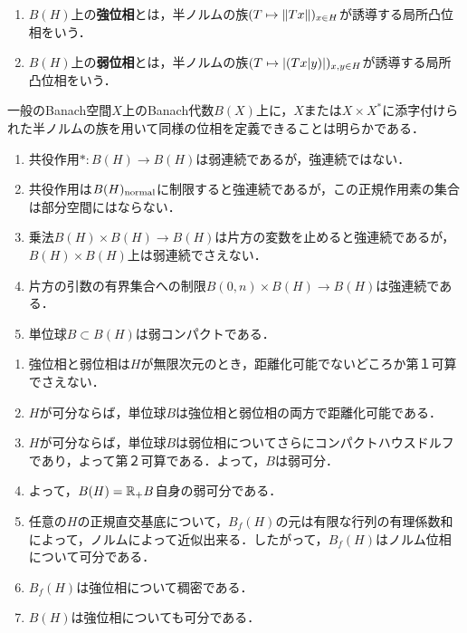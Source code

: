 \documentclass[uplatex,dvipdfmx]{jsreport}
\begin{document}
\begin{definition}\mbox{}
    \begin{enumerate}
        \item $B(H)$上の\textbf{強位相}とは，半ノルムの族$(T\mapsto\|Tx\|)_{x\in H}$が誘導する局所凸位相をいう．
        \item $B(H)$上の\textbf{弱位相}とは，半ノルムの族$(T\mapsto\lvert(Tx|y)\rvert)_{x,y\in H}$が誘導する局所凸位相をいう．
    \end{enumerate}
    一般のBanach空間$X$上のBanach代数$B(X)$上に，$X$または$X\times X^*$に添字付けられた半ノルムの族を用いて同様の位相を定義できることは明らかである．
\end{definition}
\begin{lemma}\mbox{}
    \begin{enumerate}
        \item 共役作用$*:B(H)\to B(H)$は弱連続であるが，強連続ではない．
        \item 共役作用は$B(H)_{\mathrm{normal}}$に制限すると強連続であるが，この正規作用素の集合は部分空間にはならない．
        \item 乗法$B(H)\times B(H)\to B(H)$は片方の変数を止めると強連続であるが，$B(H)\times B(H)$上は弱連続でさえない．
        \item 片方の引数の有界集合への制限$B(0,n)\times B(H)\to B(H)$は強連続である．
        \item 単位球$B\subset B(H)$は弱コンパクトである．
    \end{enumerate}
\end{lemma}

\begin{lemma}\mbox{}
    \begin{enumerate}
        \item 強位相と弱位相は$H$が無限次元のとき，距離化可能でないどころか第１可算でさえない．
        \item $H$が可分ならば，単位球$B$は強位相と弱位相の両方で距離化可能である．
        \item $H$が可分ならば，単位球$B$は弱位相についてさらにコンパクトハウスドルフであり，よって第２可算である．よって，$B$は弱可分．
        \item よって，$B(H)=\mathbb{R}_+B$自身の弱可分である．
        \item 任意の$H$の正規直交基底について，$B_f(H)$の元は有限な行列の有理係数和によって，ノルムによって近似出来る．したがって，$B_f(H)$はノルム位相について可分である．
        \item $B_f(H)$は強位相について稠密である．
        \item $B(H)$は強位相についても可分である．
    \end{enumerate}
\end{lemma}
\end{document}
